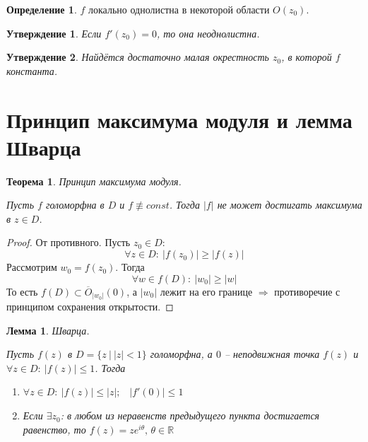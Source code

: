 \documentclass[a4paper,12pt]{article}
\renewcommand{\leq}{\ensuremath{\leqslant}}
\renewcommand{\geq}{\ensuremath{\geqslant}}
\theoremstyle{plain}
\newtheorem{theorem}{Теорема}[section]
\newtheorem{lemma}{Лемма}[section]
\newtheorem{proposition}{Утверждение}[section]
\theoremstyle{definition}
\newtheorem{definition}{Определение}[section]
\theoremstyle{remark}
\begin{document}
\begin{definition}
	$f$ локально однолистна в некоторой области $O(z_0)$.
\end{definition}

\begin{proposition}
	Если $f'(z_0) = 0$, то она неоднолистна.
\end{proposition}

\begin{proposition}
	Найдётся достаточно малая окрестность $z_0$, в которой $f$ константа.
\end{proposition}

\section{Принцип максимума модуля и лемма Шварца}
\begin{theorem}
	Принцип максимума модуля.

	Пусть $f$ голоморфна в $D$ и $f \not\equiv const$. Тогда $\vert f\vert$ не может достигать максимума в $z \in D$.
\end{theorem}

\begin{proof}
	От противного. Пусть $z_0 \in D$:
	\[
		\forall z \in D :\: \vert f(z_0)\vert \geq \vert f(z)\vert
	\]
	Рассмотрим $w_0 = f(z_0)$. Тогда
	\[
		\forall w \in f(D) :\: \vert w_0\vert \geq \vert w\vert
	\]
	То есть $f(D) \subset \overline{O}_{\vert w_0\vert}(0)$, а $\vert w_0\vert$ лежит на его границе $\Rightarrow$ противоречие с принципом сохранения открытости.
\end{proof}

\begin{lemma}
	Шварца.

	Пусть $f(z)$ в $D = \{z \:\vert\: \vert z\vert < 1\}$ голоморфна, а $0$ -- неподвижная точка $f(z)$ и $\forall z \in D :\: \vert f(z)\vert \leq 1$. Тогда
	\begin{enumerate}
		\item $\forall z \in D :\: \vert f(z)\vert \leq \vert z\vert ;\;\;\; \vert f'(0)\vert \leq 1$
		\item Если $\exists z_0$: в любом из неравенств предыдущего пункта достигается равенство, то $f(z) = ze^{i\theta},\, \theta \in \mathbb{R}$
	\end{enumerate}
\end{lemma}
\end{document}
